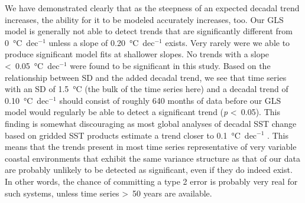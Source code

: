 \documentclass[]{ametsoc}
\begin{document}
We have demonstrated clearly that as the steepness of an expected decadal trend increases, the ability for it to be modeled accurately increases, too. Our GLS model is generally not able to detect trends that are significantly different from \SI{0}{\degreeCelsius}~dec$^{-1}$ unless a slope of \SI{0.20}{\degreeCelsius}~dec$^{-1}$ exists. Very rarely were we able to produce significant model fits at shallower slopes. No trends with a slope \textless~\SI{0.05}{\degreeCelsius}~dec$^{-1}$ were found to be significant in this study. Based on the relationship between SD and the added decadal trend, we see that time series with an SD of \SI{1.5}{\degreeCelsius} (the bulk of the time series here) and a decadal trend of \SI{0.10}{\degreeCelsius}~dec$^{-1}$ should consist of roughly 640 months of data before our GLS model would regularly be able to detect a significant trend (\emph{p} \textless~0.05). This finding is somewhat discouraging as most global analyses of decadal SST change based on gridded SST products estimate a trend closer to \SI{0.1}{\degreeCelsius}~dec$^{-1}$ \citep[\emph{e.g.}][]{IPCC2013}. This means that the trends present in most time series representative of very variable coastal environments that exhibit the same variance structure as that of our data are probably unlikely to be detected as significant, even if they do indeed exist. In other words, the chance of committing a type 2 error is probably very real for such systems, unless time series \textgreater~50 years are available.
\end{document}
